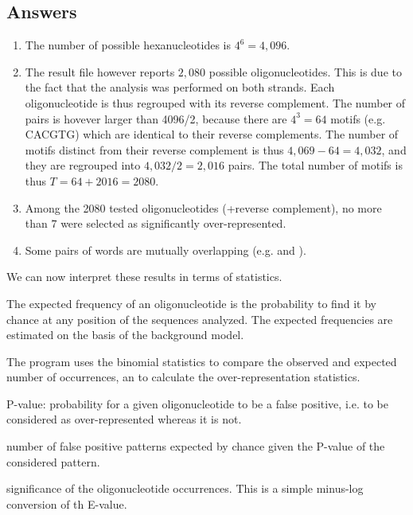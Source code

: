 \subsection{Answers}

\begin{enumerate}
\item The number of possible hexanucleotides is $4^6=4,096$.
\item The result file however reports $2,080$ possible
  oligonucleotides. This is due to the fact that the analysis was
  performed on both strands. Each oligonucleotide is thus regrouped
  with its reverse complement. The number of pairs is hovever larger
  than 4096/2, because there are $4^3=64$ motifs (e.g. CACGTG) which
  are identical to their reverse complements. The number of motifs
  distinct from their reverse complement is thus $4,069-64=4,032$, and
  they are regrouped into $4,032/2=2,016$ pairs. The total number of
  motifs is thus $T=64+2016=2080$.
\item Among the 2080 tested oligonucleotides (+reverse complement), no
  more than $7$ were selected as significantly over-represented.
\item Some pairs of words are mutually overlapping
  (e.g.  and ).
\end{enumerate}


We can now interpret these results in terms of statistics. 

\begin{description}

\item[$exp\_freq$] The expected frequency of an oligonucleotide is the
  probability to find it by chance at any position of the sequences
  analyzed. The expected frequencies are estimated on the basis of the
  background model. 

\item The program  uses the binomial
  statistics to compare the observed and expected number of
  occurrences, an to calculate the over-representation statistics.

\item[$Pval$] P-value: probability for a given oligonucleotide to be a false
  positive, i.e. to be considered as over-represented whereas it is
  not.

\item[$Eval=T \cdot Pval$] number of false positive patterns expected
  by chance given the P-value of the considered pattern. 

\item[$occ_sig =-log_{10}(Eval)$] significance of the oligonucleotide
  occurrences. This is a simple minus-log conversion of th E-value.
\item
\end{description}


